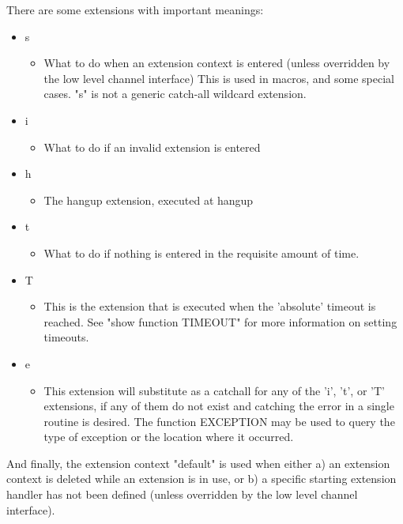 There are some extensions with important meanings:

\begin{itemize}
  \item s	
  \begin{itemize}
    \item What to do when an extension context is entered (unless
          overridden by the low level channel interface)
          This is used in macros, and some special cases. 
          "s" is not a generic catch-all wildcard extension.
  \end{itemize}
  \item i
  \begin{itemize}
    \item What to do if an invalid extension is entered
  \end{itemize}
  \item h
  \begin{itemize}
    \item The hangup extension, executed at hangup
  \end{itemize}
  \item t
  \begin{itemize}
    \item What to do if nothing is entered in the requisite amount
          of time.
  \end{itemize}
  \item T
  \begin{itemize}
    \item This is the extension that is executed when the 'absolute'
          timeout is reached.  See "show function TIMEOUT" for more
          information on setting timeouts.	
  \end{itemize}
  \item e
  \begin{itemize}
    \item This extension will substitute as a catchall for any of the
          'i', 't', or 'T' extensions, if any of them do not exist and
          catching the error in a single routine is desired.  The
          function EXCEPTION may be used to query the type of exception
          or the location where it occurred.
  \end{itemize}
\end{itemize}

And finally, the extension context "default" is used when either a) an 
extension context is deleted while an extension is in use, or b) a specific
starting extension handler has not been defined (unless overridden by the
low level channel interface).
